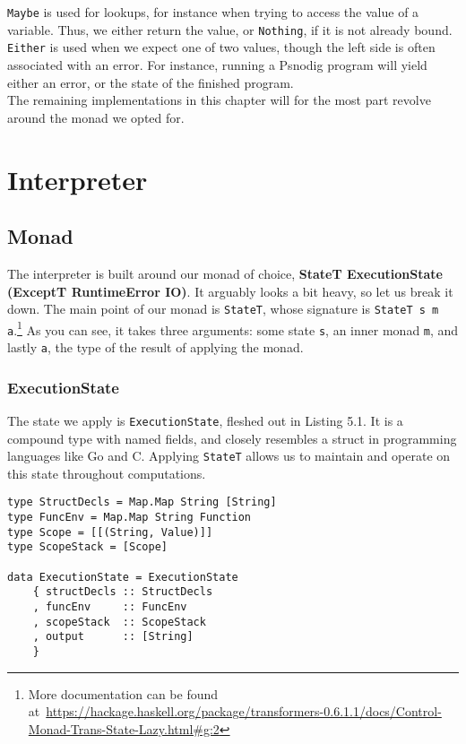 \texttt{Maybe} is used for lookups, for instance when trying to access the value of a variable. Thus, we either return the value, or \texttt{Nothing}, if it is not already bound. \texttt{Either} is used when we expect one of two values, though the left side is often associated with an error. For instance, running a Psnodig program will yield either an error, or the state of the finished program. \hfill \\

The remaining implementations in this chapter will for the most part revolve around the monad we opted for.

\section{Interpreter}

\subsection{Monad}

The interpreter is built around our monad of choice, \textbf{StateT ExecutionState (ExceptT RuntimeError IO)}. It arguably looks a bit heavy, so let us break it down. The main point of our monad is \texttt{StateT}, whose signature is \texttt{StateT s m a}.\footnote{More documentation can be found at~\url{https://hackage.haskell.org/package/transformers-0.6.1.1/docs/Control-Monad-Trans-State-Lazy.html\#g:2}} As you can see, it takes three arguments: some state \texttt{s}, an inner monad \texttt{m}, and lastly \texttt{a}, the type of the result of applying the monad.

\subsubsection{ExecutionState}

The state we apply is \texttt{ExecutionState}, fleshed out in Listing 5.1. It is a compound type with named fields, and closely resembles a struct in programming languages like Go and C. Applying \texttt{StateT} allows us to maintain and operate on this state throughout computations. \hfill \\

\begin{lstlisting}[caption={The Psnodig interpreter's state}, captionpos=b]
type StructDecls = Map.Map String [String]
type FuncEnv = Map.Map String Function
type Scope = [[(String, Value)]]
type ScopeStack = [Scope]

data ExecutionState = ExecutionState
    { structDecls :: StructDecls
    , funcEnv     :: FuncEnv
    , scopeStack  :: ScopeStack
    , output      :: [String]
    }
\end{lstlisting}

